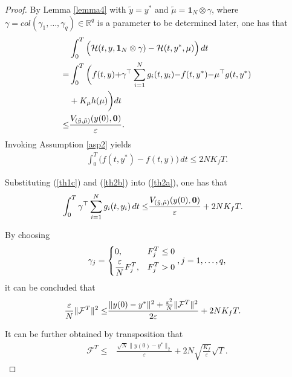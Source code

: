 \documentclass[letterpaper, 10 pt, conference]{ieeeconf}  %
\begin{document}
\begin{proof}
	By Lemma \ref{lemma4} with $\tilde{y}=y^*$ and $\tilde{\mu}= \boldsymbol{1}_N \otimes \gamma$, where $\gamma=col(\gamma_1,\dots,\gamma_q)\in\mathbb{R}^q$ is a parameter to be determined later, one has that
	\begin{align}
		&\int_{0}^{T} \Big(\mathcal{H}(t,y,\boldsymbol{1}_N\otimes \gamma) - \mathcal{H}(t,y^*,\mu)\Big) \,dt\notag\\
		=
		&\int_{0}^{T} \bigg(f(t,y){+}\gamma^\top \sum_{i=1}^{N}g_i(t,y_i){-}f(t,y^*){-}\mu^\top g(t,y^*) \notag\\
		&+K_\mu h(\mu) \bigg) dt \notag\\
		\le
		& \frac{V_{(\tilde{y}, \tilde{\mu})}(y(0), \boldsymbol{0})}{\varepsilon}.\label{th2a}
	\end{align}
	Invoking Assumption \ref{asp2} yields
	\begin{align}
		\int_{0}^{T} \big(f(t,y^*)-f(t,y) \big)\,dt \le 2NK_fT.\label{th2b}
	\end{align}
	
	Substituting (\ref{th1c}) and (\ref{th2b}) into (\ref{th2a}), one has that
	\begin{align}
		\int_{0}^{T} \gamma^\top \sum_{i=1}^{N}g_i(t,y_i)\,dt \le& \frac{V_{(\tilde{y}, \tilde{\mu})}(y(0), \boldsymbol{0})}{\varepsilon} + 2NK_fT.\notag
	\end{align}
	
	By choosing
	\begin{align}
		\gamma_j=\left\{
		\begin{aligned}
			& 0, &F_j^T\le 0 \\
			& \frac{\varepsilon}{N}F_j^T, &F_j^T>0
		\end{aligned}
		\right.,j=1,\dots,q,\notag
	\end{align}
	it can be concluded that
	\begin{align}
		\frac{\varepsilon}{N}\|\mathcal{F}^T\|^2\le &\frac{\|y(0)-y^*\|^2 + \frac{\varepsilon^2}{N}\|\mathcal{F}^T\|^2}{2\varepsilon} + 2NK_fT.\notag
	\end{align}
	
	It can be further obtained by transposition that
	\begin{align}
		\mathcal{F}^T \le& \frac{\sqrt{N}\|y(0)-y^*\|_2}{\varepsilon}  +  2N\sqrt{\frac{K_f}{\varepsilon}}\sqrt{T}.
	\end{align}	
\end{proof}
\end{document}

